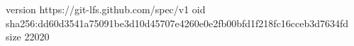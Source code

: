 version https://git-lfs.github.com/spec/v1
oid sha256:dd60d3541a75091be3d10d45707e4260e0e2fb00bfd1f218fc16cceb3d7634fd
size 22020

